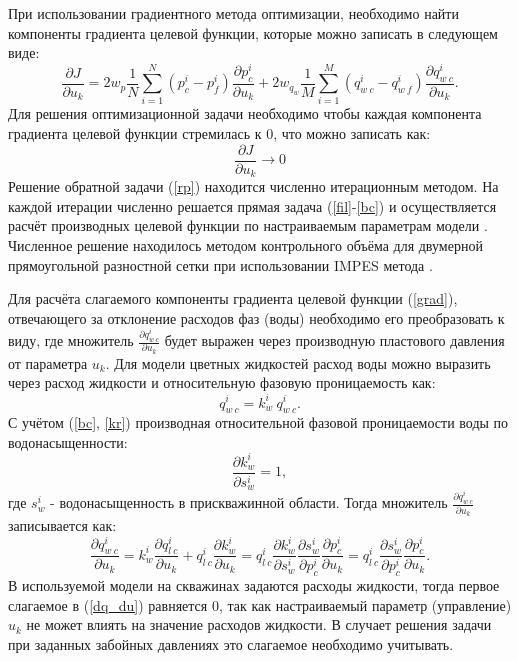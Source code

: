 \documentclass{article}
\begin{document}
При использовании градиентного метода оптимизации, необходимо найти компоненты градиента целевой функции, которые можно записать в следующем виде:
\begin{equation}\label{grad}
\frac{\partial J}{\partial u_k} = 2w_p\frac{1}{N}\sum_{i=1}^N ({p_c^i-p_f^i})\frac{\partial p_c^i}{\partial u_k}+2w_{q_w}\frac{1}{M}\sum_{i=1}^M{\left(q_{w\:c}^i-q_{w\:f}^i\right)}\frac{\partial q_{w\:c}^i}{\partial u_k}.
\end{equation}
Для решения оптимизационной задачи необходимо чтобы каждая компонента градиента целевой функции стремилась к 0, что можно записать как:
\begin{equation} \label{rp}
	 \frac{\partial J}{\partial u_k} \rightarrow 0
\end{equation}
Решение обратной задачи (\ref{rp}) находится численно итерационным методом. На каждой итерации численно решается прямая задача (\ref{fil}-\ref{bc}) и осуществляется расчёт производных целевой функции по настраиваемым параметрам модели \cite{opt}. Численное решение находилось методом контрольного объёма  для двумерной прямоугольной разностной сетки при использовании IMPES метода \cite{azi}.

Для расчёта слагаемого компоненты градиента целевой функции (\ref{grad}), отвечающего за отклонение расходов фаз (воды) необходимо его преобразовать к виду, где множитель $\frac{\partial q_{w\:c}^i}{\partial u_k}$ будет выражен через производную пластового давления от параметра $u_k$. Для модели цветных жидкостей расход воды можно выразить через расход жидкости и относительную фазовую проницаемость как:
 \begin{equation*}
 	q_{w\:c}^i = k_{w}^i \: q_{w\:c}^i.
 \end{equation*}
С учётом (\ref{bc}, \ref{kr}) производная относительной фазовой проницаемости воды по водонасыщенности:
 \begin{equation*}
	\frac{\partial k_{w}^i}{\partial s_w^i} = 1,
\end{equation*}
где $s_w^i$ - водонасыщенность в прискважинной области.
Тогда множитель $\frac{\partial q_{w\:c}^i}{\partial u_k}$ записывается как:
\begin{equation} \label{dq_du}
\frac{\partial q_{w\:c}^i}{\partial u_k} = k_{w}^i \frac{\partial q_{l\:c}^i}{\partial u_k} + q_{l\:c}^i \frac{\partial k_{w}^i}{\partial u_k} = q_{l\:c}^i \frac{\partial k_{w}^i}{\partial s_w^i} \frac{\partial s_w^i}{\partial p_c^i}\frac{\partial p_c^i}{\partial u_k} =  q_{l\:c}^i  \frac{\partial s_w^i}{\partial p_c^i}\frac{\partial p_c^i}{\partial u_k}.
\end{equation}
В используемой модели на скважинах задаются расходы жидкости, тогда первое слагаемое в (\ref{dq_du}) равняется 0, так как настраиваемый параметр (управление) $u_k$ не может влиять на значение расходов жидкости. В случает решения задачи при заданных забойных давлениях это слагаемое необходимо учитывать.
\end{document}
